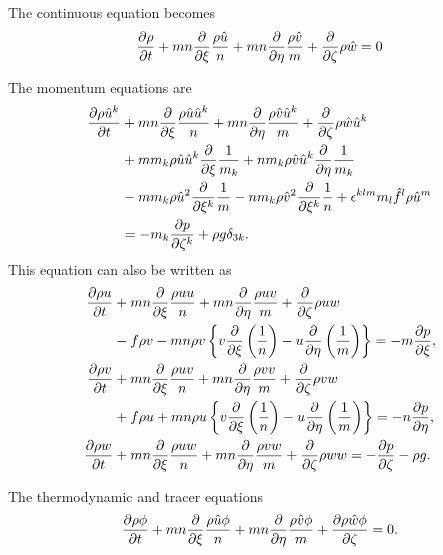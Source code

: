 The continuous equation becomes
\begin{equation}
  \frac{\partial \rho}{\partial t} + mn\frac{\partial }{\partial \xi}\frac{\rho \hat{u}}{n} + mn\frac{\partial }{\partial \eta}\frac{\rho \hat{v}}{m} + \frac{\partial }{\partial \zeta}\rho \hat{w} = 0
\end{equation}

The momentum equations are
\begin{align}
  \frac{\partial \rho\hat{u}^k}{\partial t}
  &+ mn\frac{\partial }{\partial \xi}\frac{\rho \hat{u} \hat{u}^k}{n}
   + mn\frac{\partial }{\partial \eta}\frac{\rho \hat{v} \hat{u}^k}{m}
   + \frac{\partial }{\partial \zeta}\rho \hat{w} \hat{u}^k                     \nonumber \\
  &+ m m_k \rho \hat{u} \hat{u}^k \frac{\partial }{\partial \xi}\frac{1}{m_k}
   + n m_k \rho \hat{v} \hat{u}^k \frac{\partial }{\partial \eta}\frac{1}{m_k}  \nonumber \\
  &- m m_k \rho \hat{u}^2 \frac{\partial }{\partial \xi^k}\frac{1}{m}
   - n m_k \rho \hat{v}^2 \frac{\partial }{\partial \xi^k}\frac{1}{n}
   + \epsilon^{klm} m_l \hat{f}^l \rho \hat{u}^m        \nonumber \\
  &= -m_k \frac{\partial p}{\partial \zeta^k} + \rho g \delta_{3k}.
\end{align}
This equation can also be written as 
\begin{align}
  \frac{\partial \rho u}{\partial t} &+ mn\frac{\partial }{\partial \xi}\frac{\rho uu}{n} + mn\frac{\partial }{\partial \eta}\frac{\rho uv}{m} + \frac{\partial }{\partial \zeta}\rho uw  \nonumber \\
  &- f\rho v
   - mn \rho v\left\{v\frac{\partial }{\partial \xi}\left(\frac{1}{n}\right) - u\frac{\partial }{\partial \eta}\left(\frac{1}{m}\right)\right\}
   = -m\frac{\partial p}{\partial \xi}, \\
  \frac{\partial \rho v}{\partial t} &+ mn\frac{\partial }{\partial \xi}\frac{\rho uv}{n} + mn\frac{\partial }{\partial \eta}\frac{\rho vv}{m} + \frac{\partial }{\partial \zeta}\rho vw \nonumber \\
  &+ f\rho u
   + mn \rho u\left\{v\frac{\partial }{\partial \xi}\left(\frac{1}{n}\right) - u\frac{\partial }{\partial \eta}\left(\frac{1}{m}\right)\right\}
   = -n\frac{\partial p}{\partial \eta}, \\
  \frac{\partial \rho w}{\partial t} &+ mn\frac{\partial }{\partial \xi}\frac{\rho uw}{n} + mn\frac{\partial }{\partial \eta}\frac{\rho vw}{m} + \frac{\partial }{\partial \zeta}\rho ww = -\frac{\partial p}{\partial \zeta} -\rho g.
\end{align}

The thermodynamic and tracer equations
\begin{equation}
  \frac{\partial \rho \phi}{\partial t} + mn\frac{\partial }{\partial \xi}\frac{\rho \hat{u}\phi}{n} + mn\frac{\partial }{\partial \eta}\frac{\rho \hat{v}\phi}{m} + \frac{\partial \rho \hat{w}\phi}{\partial \zeta} = 0.
\end{equation}


%
